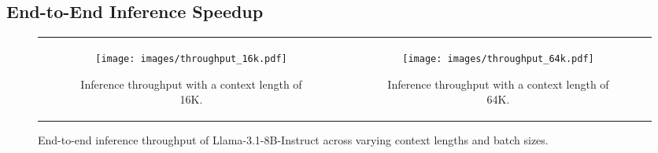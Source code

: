 

\subsection{End-to-End Inference Speedup}

\begin{figure}[t]
    \centering
    \begin{tabular}{cc}
        \begin{subfigure}[b]{0.475\columnwidth}
            \centering
            \texttt{[image: images/throughput\_16k.pdf]}
            \caption{Inference throughput with a context length of 16K.}
        \end{subfigure}
        & 
        \begin{subfigure}[b]{0.475\columnwidth}
            \centering
            \texttt{[image: images/throughput\_64k.pdf]}
            \caption{Inference throughput with a context length of 64K.}
        \end{subfigure}
    \end{tabular}

    \caption{End-to-end inference throughput of Llama-3.1-8B-Instruct across varying context lengths and batch sizes.}
    \label{fig:throughput}
\end{figure}

